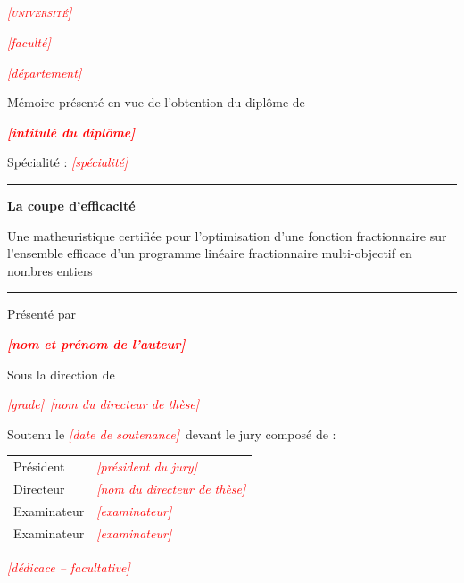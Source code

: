 \documentclass[11pt,a4paper]{article}
\title{\bfseries \LeTitre\\[2pt]
\large \LeSousTitre}
\author{}
\date{}
\theoremstyle{plain}
\theoremstyle{remark}
\newcommand{\aRemplir}[1]{\textcolor{red}{\itshape[#1]}}
\newcommand{\Auteur}{\aRemplir{nom et prénom de l'auteur}}
\newcommand{\Universite}{\aRemplir{université}}
\newcommand{\Faculte}{\aRemplir{faculté}}
\newcommand{\Departement}{\aRemplir{département}}
\newcommand{\Diplome}{\aRemplir{intitulé du diplôme}}
\newcommand{\Specialite}{\aRemplir{spécialité}}
\newcommand{\Encadrant}{\aRemplir{nom du directeur de thèse}}
\newcommand{\GradeEncadrant}{\aRemplir{grade}}
\newcommand{\JuryPresident}{\aRemplir{président du jury}}
\newcommand{\JuryExamA}{\aRemplir{examinateur}}
\newcommand{\JuryExamB}{\aRemplir{examinateur}}
\newcommand{\DateSoutenance}{\aRemplir{date de soutenance}}
\newcommand{\LeTitre}{La coupe d'efficacité}
\newcommand{\LeSousTitre}{Une matheuristique certifiée pour l'optimisation d'une fonction
fractionnaire sur l'ensemble efficace d'un programme linéaire fractionnaire
multi-objectif en nombres entiers}
\begin{document}
\begin{titlepage}
\centering
\vspace*{0.4cm}
{\large\scshape \Universite\par}
\vspace{2mm}
{\large \Faculte\par}
{\large \Departement\par}
\vspace{1.6cm}
{\large Mémoire présenté en vue de l'obtention du diplôme de\par}
\vspace{2mm}
{\Large\bfseries \Diplome\par}
\vspace{2mm}
{\large Spécialité : \Specialite\par}
\vspace{1.4cm}
\rule{\linewidth}{0.5pt}\par\vspace{5mm}
{\LARGE\bfseries \LeTitre\par}\vspace{4mm}
{\large \LeSousTitre\par}
\vspace{5mm}\rule{\linewidth}{0.5pt}
\vspace{1.4cm}
{\large Présenté par\par}\vspace{2mm}
{\Large\bfseries \Auteur\par}
\vspace{1.4cm}
{\large Sous la direction de\par}\vspace{2mm}
{\large \GradeEncadrant~\Encadrant\par}
\vfill
{\large Soutenu le \DateSoutenance\ devant le jury composé de :\par}
\vspace{4mm}
\begin{tabular}{ll}
Président    & \JuryPresident\\
Directeur    & \Encadrant\\
Examinateur  & \JuryExamA\\
Examinateur  & \JuryExamB\\
\end{tabular}
\vfill
\end{titlepage}

\thispagestyle{empty}
\vspace*{3cm}
\begin{flushright}\itshape
\aRemplir{dédicace -- facultative}
\end{flushright}
\clearpage
\end{document}
